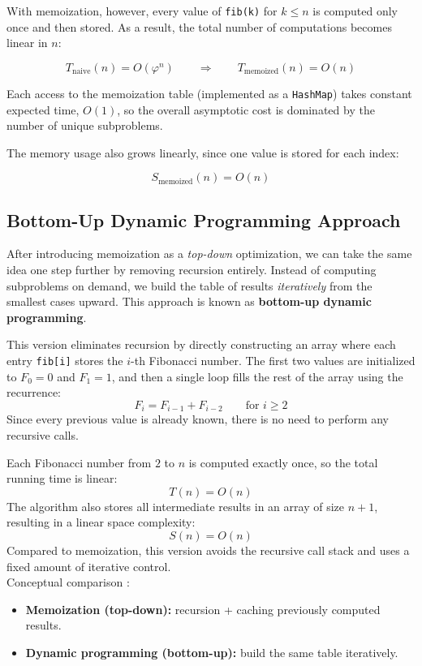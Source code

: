 \documentclass{article}
\begin{document}
With memoization, however, every value of \texttt{fib(k)} for $k \le n$ is computed only once and then stored.
As a result, the total number of computations becomes linear in $n$:

\[
	T_{\text{naive}}(n) = O(\varphi^n)
	\qquad \Longrightarrow \qquad
	T_{\text{memoized}}(n) = O(n)
\]

Each access to the memoization table (implemented as a \texttt{HashMap}) takes constant expected time, $O(1)$,
so the overall asymptotic cost is dominated by the number of unique subproblems.

The memory usage also grows linearly, since one value is stored for each index:

\[
	S_{\text{memoized}}(n) = O(n)
\]

\subsection{Bottom-Up Dynamic Programming Approach}
After introducing memoization as a \emph{top-down} optimization,
we can take the same idea one step further by removing recursion entirely.
Instead of computing subproblems on demand, we build the table of results
\emph{iteratively} from the smallest cases upward.
This approach is known as \textbf{bottom-up dynamic programming}.



This version eliminates recursion by directly constructing an array
where each entry \texttt{fib[i]} stores the $i$-th Fibonacci number.
The first two values are initialized to $F_0 = 0$ and $F_1 = 1$,
and then a single loop fills the rest of the array using the recurrence:
\[
	F_i = F_{i-1} + F_{i-2} \qquad \text{for } i \ge 2
\]
Since every previous value is already known, there is no need to perform any recursive calls.

Each Fibonacci number from $2$ to $n$ is computed exactly once,
so the total running time is linear:
\[
	T(n) = O(n)
\]
The algorithm also stores all intermediate results in an array of size $n + 1$,
resulting in a linear space complexity:
\[
	S(n) = O(n)
\]
Compared to memoization, this version avoids the recursive call stack and uses
a fixed amount of iterative control.
\\
Conceptual comparison :
\begin{itemize}
	\item \textbf{Memoization (top-down):} recursion + caching previously computed results.
	\item \textbf{Dynamic programming (bottom-up):} build the same table iteratively.
\end{itemize}
\end{document}
